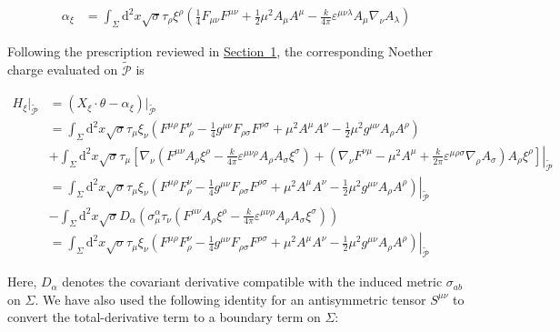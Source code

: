 \begin{align}
\alpha _{\xi} & =\int _{\Sigma}\mathrm{d}^{2}x\sqrt{ \sigma }\tau _{\rho}\xi ^{\rho}\left(\frac{1}{4}F_{\mu \nu}F^{\mu \nu}+\frac{1}{2}\mu ^{2}A_{\mu}A^{\mu}-\frac{k}{4\pi}\varepsilon ^{\mu \nu \lambda}A_{\mu}\nabla _{\nu}A_{\lambda}\right)
\end{align}

Following the prescription reviewed in \hyperref[sec:proca-cs-global-ads3]{Section~1}, the corresponding Noether charge evaluated on $\widetilde{\mathcal{P}}$ is

\begin{align}
H_{\xi}|_{\widetilde{\mathcal{P}}} & =(X_{\xi}\cdot \theta-\alpha _{\xi})|_{\widetilde{\mathcal{P}}} \\
 & =\int _{\Sigma}\mathrm{d}^{2}x\sqrt{ \sigma }\tau _{\mu}\xi _{\nu}\left( F^{\mu \rho}F^{\nu}_{~\rho}-\frac{1}{4}g^{\mu \nu}F_{\rho \sigma}F^{\rho \sigma}+\mu ^{2}A^{\mu}A^{\nu}-\frac{1}{2}\mu ^{2}g^{\mu \nu}A_{\rho}A^{\rho} \right) \\
 & +\left.\int _{\Sigma}\mathrm{d}^{2}x\sqrt{ \sigma }\tau _{\mu}\left[ \nabla _{\nu}\left( F^{\mu \nu}A_{\rho}\xi ^{\rho}-\frac{k}{4\pi}\varepsilon ^{\mu \nu \rho}A_{\rho}A_{\sigma}\xi ^{\sigma} \right)+\left( \nabla _{\nu}F^{\nu \mu}-\mu ^{2}A^{\mu}+\frac{k}{2\pi}\varepsilon ^{\mu \rho \sigma}\nabla _{\rho}A_{\sigma} \right)A_{\rho}\xi ^{\rho} \right] \right|_{\widetilde{\mathcal{P}}}\\
 & =\left.\int _{\Sigma}\mathrm{d}^{2}x\sqrt{ \sigma }\tau _{\mu}\xi _{\nu}\left( F^{\mu \rho}F^{\nu}_{\rho}-\frac{1}{4}g^{\mu \nu}F_{\rho \sigma}F^{\rho \sigma}+\mu ^{2}A^{\mu}A^{\nu}-\frac{1}{2}\mu ^{2}g^{\mu \nu}A_{\rho}A^{\rho}\right)\right|_{\widetilde{\mathcal{P}}} \\
 & -\int _{\Sigma}\mathrm{d}^{2}x\sqrt{ \sigma }D_{\alpha}\left(\sigma ^{\alpha}_{\mu}\tau _{\nu}\left(F^{\mu \nu}A_{\rho}\xi ^{\rho}-\frac{k}{4\pi}\varepsilon ^{\mu \nu \rho}A_{\rho}A_{\sigma}\xi ^{\sigma}\right)\right) \\
 & =\left.\int _{\Sigma}\mathrm{d}^{2}x\sqrt{ \sigma }\tau _{\mu}\xi _{\nu}\left( F^{\mu \rho}F^{\nu}_{\rho}-\frac{1}{4}g^{\mu \nu}F_{\rho \sigma}F^{\rho \sigma}+\mu ^{2}A^{\mu}A^{\nu}-\frac{1}{2}\mu ^{2}g^{\mu \nu}A_{\rho}A^{\rho}\right)\right|_{\widetilde{\mathcal{P}}}
\end{align}

Here, $D_{\alpha}$ denotes the covariant derivative compatible with the induced metric $\sigma _{ab}$ on $\Sigma$. We have also used the following identity for an antisymmetric tensor $S^{\mu \nu}$ to convert the total-derivative term to a boundary term on $\Sigma$:

